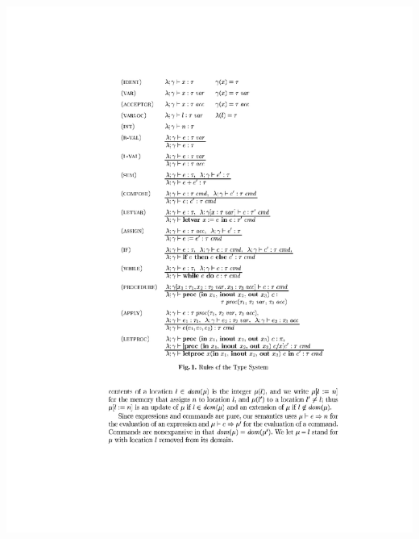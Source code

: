 \documentclass{beamer}
\begin{document}
    
\begin{frame}[fragile]
\begin{center}
\includegraphics[scale=1.2]{figures/typesys2}
\end{center}
\end{frame}
    
\end{document}
